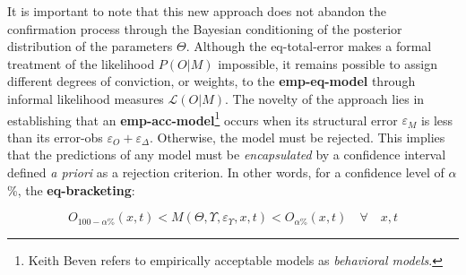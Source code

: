 \documentclass[./main_en.tex]{subfiles}
\begin{document}
\noindent It is important to note that this new approach does not abandon the confirmation process through the Bayesian \gls{conditioning} of the posterior distribution of the \gls{parameters} $\Theta$. Although the \gls{eq-total-error} makes a formal treatment of the \gls{likelihood} $P(O|M)$ impossible, it remains possible to assign different degrees of conviction, or weights, to the \textbf{\gls{emp-eq-model}} through informal \gls{likelihood} measures $\mathcal{L}(O|M)$. The novelty of the approach lies in establishing that an \textbf{\gls{emp-acc-model}}\footnote{Keith Beven refers to empirically acceptable models as \textit{behavioral models}.} occurs when its structural error $\varepsilon_M$ is less than its \gls{error-obs} $\varepsilon_O + \varepsilon_{\Delta}$. Otherwise, the \gls{model} must be rejected. This implies that the predictions of any \gls{model} must be \textit{encapsulated} by a confidence interval defined \textit{a priori} as a rejection criterion. In other words, for a confidence level of $\alpha$\%, the \textbf{\gls{eq-bracketing}}:
\begin{linenomath*}
\begin{equation}
\label{eq:bracketing}
    O_{100-\alpha\%}(x, t) < M(\Theta, \Upsilon, \varepsilon_{\Upsilon}, x, t) < O_{\alpha\%}(x, t) \quad \forall \quad x, t
\end{equation}
\end{linenomath*}
\end{document}
